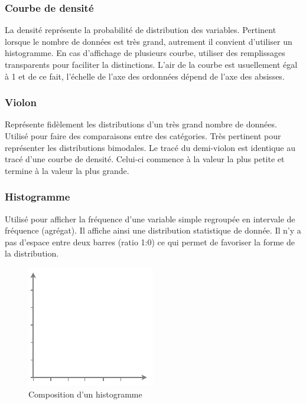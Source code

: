 \documentclass[a4paper,12pt]{article}
\begin{document}
\begin{multicols}{2}
\subsubsection*{Courbe de densité}
\label{sec:org7394e4e}
La densité représente la probabilité de distribution des variables. \autocite{sosulskiGraphics2019} Pertinent lorsque le nombre de données est très grand, autrement il convient d'utiliser un histogramme. \autocite{wilkeVisualizingManyDistributions2019} En cas d'affichage de plusieurs courbe, utiliser  des remplissages transparents pour faciliter la distinctions. L'air de la courbe est usuellement égal à 1 et de ce fait, l'échelle de l'axe des ordonnées dépend de l'axe des absisses. \autocite{wilkeVisualizingManyDistributions2019}
\subsubsection*{Violon}
\label{sec:org37d2dd1}
Représente fidèlement les distributions d'un très grand nombre de données. \autocite{alansmithLexiqueVisuel} Utilisé pour faire des comparaisons entre des catégories. \autocite{mikeyiHowChooseRight2020}  Très pertinent pour représenter les distributions bimodales. \autocite{wilkeVisualizingManyDistributions2019} Le tracé du demi-violon est identique au tracé d'une courbe de densité. Celui-ci commence à la valeur la plus petite et termine à la valeur la plus grande.
\subsubsection*{Histogramme}
\label{sec:orgded071e}
Utilisé pour afficher la fréquence d'une variable simple regroupée en intervale de fréquence (agrégat).\autocite{sosulskiGraphics2019} Il affiche ainsi une distribution statistique de donnée. Il n'y a pas d'espace entre deux barres (ratio 1:0) ce qui permet de favoriser la forme de la distribution. \autocite{alansmithLexiqueVisuel}

\begin{figure}[H]
\centering
\includegraphics[width=.9\linewidth]{./img/histogram-compo.pdf}
\caption{\label{fig:Compo-histogram}Composition d'un histogramme}
\end{figure}


\end{multicols}
\end{document}
